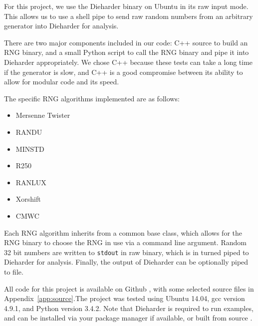 For this project, we use the Dieharder binary on Ubuntu in its raw input mode. This allows us to use a shell pipe to send raw random numbers from an arbitrary generator into Dieharder for analysis.

There are two major components included in our code: C++ source to build an RNG binary, and a small Python script to call the RNG binary and pipe it into Dieharder appropriately. We chose C++ because these tests can take a long time if the generator is slow, and C++ is a good compromise between its ability to allow for modular code and its speed.

The specific RNG algorithms implemented are as follows:
\begin{itemize}
    \item Mersenne Twister
    \item RANDU
    \item MINSTD
    \item R250
    \item RANLUX
    \item Xorshift
    \item CMWC
\end{itemize}
Each RNG algorithm inherits from a common base class, which allows for the RNG binary to choose the RNG in use via a command line argument. Random 32 bit numbers are written to \texttt{stdout} in raw binary, which is in turned piped to Dieharder for analysis. Finally, the output of Dieharder can be optionally piped to file.

All code for this project is available on Github \cite{github_repo}, with some selected source files in Appendix~\ref{app:source}.The project was tested using Ubuntu 14.04, gcc version 4.9.1, and Python version 3.4.2. Note that Dieharder is required to run examples, and can be installed via your package manager if available, or built from source \cite{dieharder_website}.

